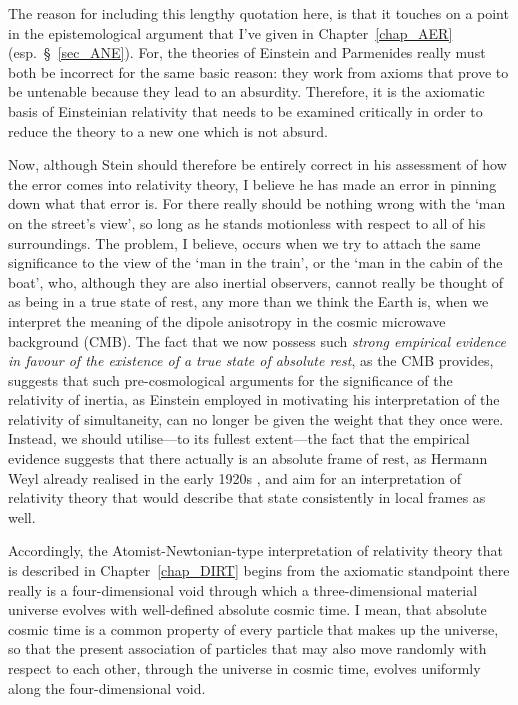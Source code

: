 The reason for including this lengthy quotation here, is that it touches on a point in the epistemological argument that I've given in Chapter~\ref{chap_AER} (esp.~\S~\ref{sec_ANE}). For, the theories of Einstein and Parmenides really must both be incorrect for the same basic reason: they work from axioms that prove to be untenable because they lead to an absurdity. Therefore, it is the axiomatic basis of Einsteinian relativity that needs to be examined critically in order to reduce the theory to a new one which is not absurd.

Now, although Stein should therefore be entirely correct in his assessment of how the error comes into relativity theory, I believe he has made an error in pinning down what that error is. For there really should be nothing wrong with the `man on the street's view', so long as he stands motionless with respect to all of his surroundings. The problem, I believe, occurs when we try to attach the same significance to the view of the `man in the train', or the `man in the cabin of the boat', who, although they are also inertial observers, cannot really be thought of as being in a true state of rest, any more than we think the Earth is, when we interpret the meaning of the dipole anisotropy in the cosmic microwave background (CMB). The fact that we now possess such \textit{strong empirical evidence in favour of the existence of a true state of absolute rest}, as the CMB provides, suggests that such pre-cosmological arguments for the significance of the relativity of inertia, as Einstein employed in motivating his interpretation of the relativity of simultaneity, can no longer be given the weight that they once were. Instead, we should utilise---to its fullest extent---the fact that the empirical evidence suggests that there actually is an absolute frame of rest, as Hermann Weyl already realised in the early 1920s \cite{Weyl1923,Weyl2009,Weyl1924,Weyl1930,Robertson1933,Bondi1961,Ehlers2009,Rugh2010}, and aim for an interpretation of relativity theory that would describe that state consistently in local frames as well.

Accordingly, the Atomist-Newtonian-type interpretation of relativity theory that is described in Chapter~\ref{chap_DIRT} begins from the axiomatic standpoint there really is a four-dimensional void through which a three-dimensional material universe evolves with well-defined absolute cosmic time. I mean, that absolute cosmic time is a common property of every particle that makes up the universe, so that the present association of particles that may also move randomly with respect to each other, through the universe in cosmic time, evolves uniformly along the four-dimensional void.

